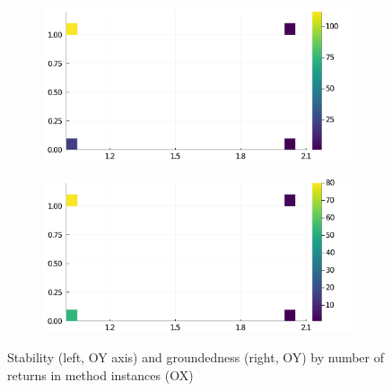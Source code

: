 \begin{figure}[h]
     \begin{subfigure}[b]{0.49\textwidth}
       \includegraphics[width=\textwidth]{figs/all-package-graphs/IJulia-returns-vs-stable.pdf}
     \end{subfigure}
     \begin{subfigure}[b]{0.49\textwidth}
       \includegraphics[width=\textwidth]{figs/all-package-graphs/IJulia-returns-vs-grounded.pdf}
     \end{subfigure}
\caption{Stability (left, OY axis) and groundedness (right, OY) by number of returns in method instances (OX)}%
%
\label{figs:returns:IJulia}
\end{figure}
\clearpage
